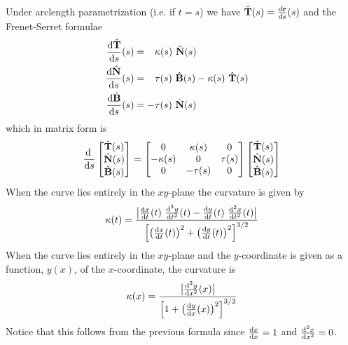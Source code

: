 Under arclength parametrization (i.e. if $t=s$) we have
$\hat{\mathbf{T}}(s)=\frac{d\mathbf{r}}{ds}(s)$ and the Frenet-Serret formulae 
\begin{align*}
\diff{\hat\vT}{s}(s)&=\phantom{-}\ka(s)\ \hat\vN(s)\cr
\diff{\hat\vN}{s}(s)&=\phantom{-}\tau(s)\ \hat\vB(s)-\ka(s)\ \hat\vT(s)\cr
\diff{\hat\vB}{s}(s)&=-\tau(s)\ \hat\vN(s)\cr
\end{align*}
which in matrix form is
\begin{align*}
\diff{}{s}
\left[ \begin{matrix}\hat\vT(s)\\ \hat\vN(s)\\ \hat\vB(s)\end{matrix} \right]
=\left[\begin{matrix} 0      & \ka(s) & 0\\
              -\ka(s) &  0     &\tau(s) \\
              0       &-\tau(s)  & 0 \end{matrix}\right]
\left[\begin{matrix}\hat\vT(s)\\ \hat\vN(s)\\ \hat\vB(s)\end{matrix}\right]
\end{align*}
When the curve lies entirely in the $xy$-plane the curvature is given by
\begin{align*}
\ka(t)
=\frac{\big|
  \diff{x}{t}(t)\ \difftwo{y}{t}(t)-\diff{y}{t}(t)\ \difftwo{x}{t}(t)
  \big|}{\Big[\big(\diff{x}{t}(t)\big)^2
                +\big(\diff{y}{t}(t)\big)^2\Big]^{3/2}}
\end{align*}
\noindent When the curve lies entirely in the $xy$-plane and the 
$y$-coordinate is given as a function, $y(x)$, of the $x$-coordinate,
the curvature is
\begin{align*}
\ka(x)
=\frac{\big|\difftwo{y}{x}(x)\big|}
  {\Big[1+\big(\diff{y}{x}(x)\big)^2\Big]^{3/2}}
\end{align*}
Notice that this follows from the previous formula since
$\diff{x}{x}=1$ and $\difftwo{x}{x}=0$.

